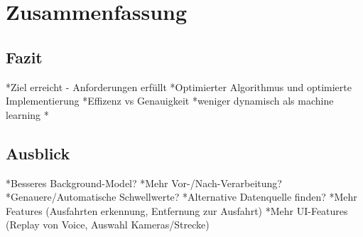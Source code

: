 \chapter{Zusammenfassung}

\section{Fazit}
*Ziel erreicht - Anforderungen erfüllt
*Optimierter Algorithmus und optimierte Implementierung\newline
*Effizenz vs Genauigkeit\newline
*weniger dynamisch als machine learning\newline
*
\newpage

\section{Ausblick}
*Besseres Background-Model?\newline
*Mehr Vor-/Nach-Verarbeitung?\newline
*Genauere/Automatische Schwellwerte?\newline
*Alternative Datenquelle finden?\newline
*Mehr Features (Ausfahrten erkennung, Entfernung zur Ausfahrt)\newline
*Mehr UI-Features (Replay von Voice, Auswahl Kameras/Strecke)\newline
